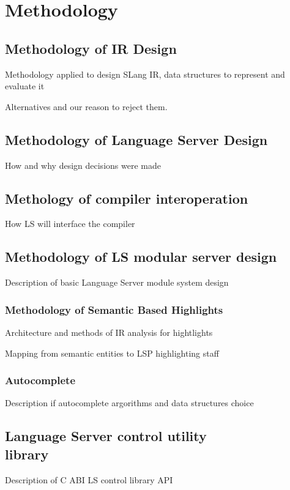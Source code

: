 \chapter{Methodology}
\label{chap:met}

\section{Methodology of IR Design}
\label{sec:met:ir_design}
Methodology applied to design SLang IR, data structures to represent and evaluate it

Alternatives and our reason to reject them.

\section{Methodology of Language Server Design}
\label{sec:met:ls_design}
How and why design decisions were made

\section{Methology of compiler interoperation}
\label{sec:met:ls_compiler_interop}
How LS will interface the compiler

\section{Methodology of LS modular server design}
\label{sec:met:ls_mod}
Description of basic Language Server module system design

\subsection{Methodology of Semantic Based Highlights}
\label{sec:met:ls_mod:semhighlight}
Architecture and methods of IR analysis for hightlights

Mapping from semantic entities to LSP highlighting staff

\subsection{Autocomplete}
\label{sec:impl:ls_mod:autocomplete}
Description if autocomplete argorithms and data structures choice


\section{Language Server control utility\\ library}
\label{sec:impl:ls_control_api}
Description of C ABI LS control library API